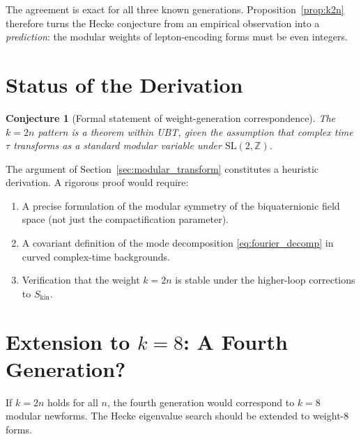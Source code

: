 \documentclass[12pt,a4paper]{article}
\newtheorem{conjecture}[theorem]{Conjecture}
\theoremstyle{definition}
\theoremstyle{remark}
\begin{document}
The agreement is exact for all three known generations.  Proposition~\ref{prop:k2n}
therefore turns the Hecke conjecture from an empirical observation into a
\emph{prediction}: the modular weights of lepton-encoding forms must be even
integers.

\section{Status of the Derivation}
\label{sec:status}

\begin{conjecture}[Formal statement of weight-generation correspondence]
\label{conj:k2n}
The $k = 2n$ pattern is a theorem within UBT, given the assumption that
complex time $\tau$ transforms as a standard modular variable under
$\mathrm{SL}(2,\mathbb{Z})$.
\end{conjecture}

The argument of Section~\ref{sec:modular_transform} constitutes a heuristic
derivation.  A rigorous proof would require:
\begin{enumerate}
  \item A precise formulation of the modular symmetry of the biquaternionic
        field space (not just the compactification parameter).
  \item A covariant definition of the mode decomposition
        \eqref{eq:fourier_decomp} in curved complex-time backgrounds.
  \item Verification that the weight $k = 2n$ is stable under the higher-loop
        corrections to $S_{\mathrm{kin}}$.
\end{enumerate}

\section{Extension to $k = 8$: A Fourth Generation?}
\label{sec:k8_search}

If $k = 2n$ holds for all $n$, the fourth generation would correspond to
$k = 8$ modular newforms.  The Hecke eigenvalue search should be extended to
weight-8 forms.
\end{document}
